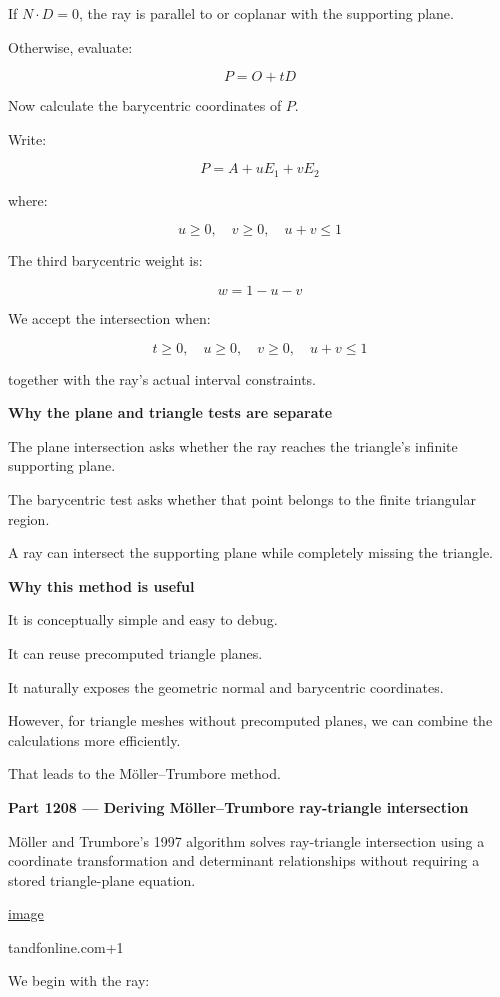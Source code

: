 If \(N\cdot D=0\), the ray is parallel to or coplanar with the supporting plane.

Otherwise, evaluate:

\[
P=O+tD
\]

Now calculate the barycentric coordinates of \(P\).

Write:

\[
P=A+uE_1+vE_2
\]

where:

\[
u\ge0,\quad v\ge0,\quad u+v\le1
\]

The third barycentric weight is:

\[
w=1-u-v
\]

We accept the intersection when:

\[
\boxed{ t\ge0,\quad u\ge0,\quad v\ge0,\quad u+v\le1 }
\]

together with the ray's actual interval constraints.

\textbf{Why the plane and triangle tests are separate}

The plane intersection asks whether the ray reaches the triangle's infinite supporting plane.

The barycentric test asks whether that point belongs to the finite triangular region.

A ray can intersect the supporting plane while completely missing the triangle.

\textbf{Why this method is useful}

It is conceptually simple and easy to debug.

It can reuse precomputed triangle planes.

It naturally exposes the geometric normal and barycentric coordinates.

However, for triangle meshes without precomputed planes, we can combine the calculations more efficiently.

That leads to the Möller--Trumbore method.

\textbf{Part 1208 --- Deriving Möller--Trumbore ray-triangle intersection}

Möller and Trumbore's 1997 algorithm solves ray-triangle intersection using a coordinate transformation and determinant relationships without requiring a stored triangle-plane equation. 

\href{https://www.google.com/s2/favicons?domain=https://www.tandfonline.com&sz=32}{image}

tandfonline.com+1

We begin with the ray:

